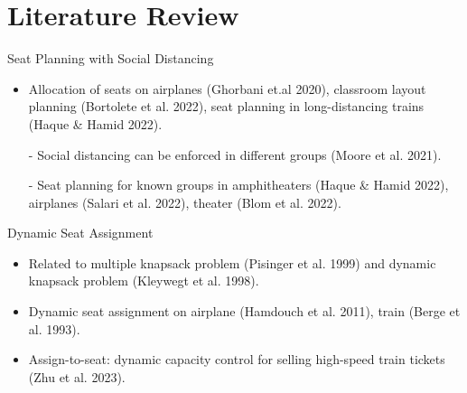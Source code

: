 
\section{Literature Review}
    \frame{\sectionpage}
    \begin{frame}{Seat Planning with Social Distancing}
      \begin{itemize}
        \item Allocation of seats on airplanes (Ghorbani et.al 2020), classroom layout planning (Bortolete et al. 2022), seat planning in long-distancing trains (Haque \& Hamid 2022).
        \vspace*{0.5cm}

        \item[-] Social distancing can be enforced in different groups (Moore et al. 2021).
        \vspace*{0.5cm}

        \item[-] Seat planning for known groups in amphitheaters (Haque \& Hamid 2022), airplanes (Salari et al. 2022), theater (Blom et al. 2022).
      \end{itemize}
      \end{frame}
      
      \begin{frame}{Dynamic Seat Assignment}
        \begin{itemize}
          \item Related to multiple knapsack problem (Pisinger et al. 1999) and dynamic knapsack problem (Kleywegt et al. 1998).
          \vspace*{0.5cm}
          \item Dynamic seat assignment on airplane (Hamdouch et al. 2011), train (Berge et al. 1993).
          \vspace*{0.5cm}
          \item Assign-to-seat: dynamic capacity control for selling high-speed train tickets (Zhu et al. 2023).
        \end{itemize}
      \end{frame}